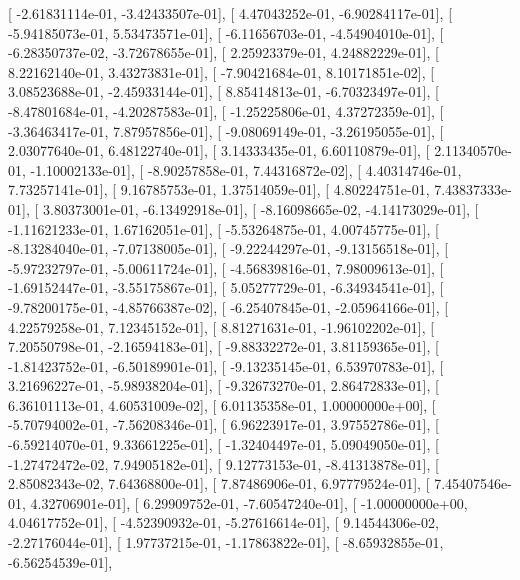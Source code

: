 \documentclass{article}
\begin{document}
       [ -2.61831114e-01,  -3.42433507e-01],
       [  4.47043252e-01,  -6.90284117e-01],
       [ -5.94185073e-01,   5.53473571e-01],
       [ -6.11656703e-01,  -4.54904010e-01],
       [ -6.28350737e-02,  -3.72678655e-01],
       [  2.25923379e-01,   4.24882229e-01],
       [  8.22162140e-01,   3.43273831e-01],
       [ -7.90421684e-01,   8.10171851e-02],
       [  3.08523688e-01,  -2.45933144e-01],
       [  8.85414813e-01,  -6.70323497e-01],
       [ -8.47801684e-01,  -4.20287583e-01],
       [ -1.25225806e-01,   4.37272359e-01],
       [ -3.36463417e-01,   7.87957856e-01],
       [ -9.08069149e-01,  -3.26195055e-01],
       [  2.03077640e-01,   6.48122740e-01],
       [  3.14333435e-01,   6.60110879e-01],
       [  2.11340570e-01,  -1.10002133e-01],
       [ -8.90257858e-01,   7.44316872e-02],
       [  4.40314746e-01,   7.73257141e-01],
       [  9.16785753e-01,   1.37514059e-01],
       [  4.80224751e-01,   7.43837333e-01],
       [  3.80373001e-01,  -6.13492918e-01],
       [ -8.16098665e-02,  -4.14173029e-01],
       [ -1.11621233e-01,   1.67162051e-01],
       [ -5.53264875e-01,   4.00745775e-01],
       [ -8.13284040e-01,  -7.07138005e-01],
       [ -9.22244297e-01,  -9.13156518e-01],
       [ -5.97232797e-01,  -5.00611724e-01],
       [ -4.56839816e-01,   7.98009613e-01],
       [ -1.69152447e-01,  -3.55175867e-01],
       [  5.05277729e-01,  -6.34934541e-01],
       [ -9.78200175e-01,  -4.85766387e-02],
       [ -6.25407845e-01,  -2.05964166e-01],
       [  4.22579258e-01,   7.12345152e-01],
       [  8.81271631e-01,  -1.96102202e-01],
       [  7.20550798e-01,  -2.16594183e-01],
       [ -9.88332272e-01,   3.81159365e-01],
       [ -1.81423752e-01,  -6.50189901e-01],
       [ -9.13235145e-01,   6.53970783e-01],
       [  3.21696227e-01,  -5.98938204e-01],
       [ -9.32673270e-01,   2.86472833e-01],
       [  6.36101113e-01,   4.60531009e-02],
       [  6.01135358e-01,   1.00000000e+00],
       [ -5.70794002e-01,  -7.56208346e-01],
       [  6.96223917e-01,   3.97552786e-01],
       [ -6.59214070e-01,   9.33661225e-01],
       [ -1.32404497e-01,   5.09049050e-01],
       [ -1.27472472e-02,   7.94905182e-01],
       [  9.12773153e-01,  -8.41313878e-01],
       [  2.85082343e-02,   7.64368800e-01],
       [  7.87486906e-01,   6.97779524e-01],
       [  7.45407546e-01,   4.32706901e-01],
       [  6.29909752e-01,  -7.60547240e-01],
       [ -1.00000000e+00,   4.04617752e-01],
       [ -4.52390932e-01,  -5.27616614e-01],
       [  9.14544306e-02,  -2.27176044e-01],
       [  1.97737215e-01,  -1.17863822e-01],
       [ -8.65932855e-01,  -6.56254539e-01],
\end{document}
